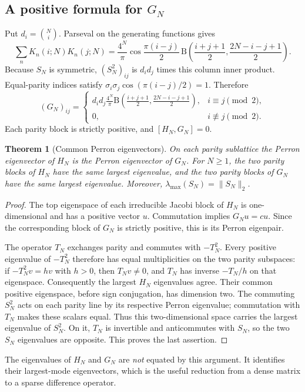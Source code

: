 \documentclass[11pt,reqno]{amsart}
\newtheorem{theorem}{Theorem}[section]
\theoremstyle{definition}\newtheorem{definition}[theorem]{Definition}
\theoremstyle{remark}\newtheorem{remark}[theorem]{Remark}
\newcommand{\norm}[1]{\lVert #1\rVert}
\begin{document}
\subsection{A positive formula for $G_N$}
Put $d_i=\binom Ni$. Parseval on the generating functions gives
\begin{equation}\label{eq:bilinear}
\sum_nK_n(i;N)K_n(j;N)
=\frac{4^N}{\pi}\cos\frac{\pi(i-j)}2\,
\mathrm B\left(\frac{i+j+1}{2},\frac{2N-i-j+1}{2}\right).
\end{equation}
Because $S_N$ is symmetric, $(S_N^2)_{ij}$ is $d_id_j$ times this
column inner product. Equal-parity indices satisfy
$\sigma_i\sigma_j\cos(\pi(i-j)/2)=1$. Therefore
\begin{equation}\label{eq:G-entries}
(G_N)_{ij}=\begin{cases}
\displaystyle d_id_j\frac{4^N}{\pi}
\mathrm B\left(\frac{i+j+1}{2},\frac{2N-i-j+1}{2}\right),
&i\equiv j\pmod2,\\[4pt]
0,&i\not\equiv j\pmod2.
\end{cases}
\end{equation}
Each parity block is strictly positive, and $[H_N,G_N]=0$.

\begin{theorem}[Common Perron eigenvectors]\label{thm:common-PF}
On each parity sublattice the Perron eigenvector of $H_N$ is the
Perron eigenvector of $G_N$. For $N\ge1$, the two parity blocks of
$H_N$ have the same largest eigenvalue, and the two parity blocks of
$G_N$ have the same largest eigenvalue. Moreover,
$\lambda_{\max}(S_N)=\norm{S_N}_2$.
\end{theorem}
\begin{proof}
The top eigenspace of each irreducible Jacobi block of $H_N$ is
one-dimensional and has a positive vector $u$. Commutation implies
$G_Nu=cu$. Since the corresponding block of $G_N$ is strictly positive,
this is its Perron eigenpair.

The operator $T_N$ exchanges parity and commutes with $-T_N^2$.
Every positive eigenvalue of $-T_N^2$ therefore has equal multiplicities
on the two parity subspaces: if $-T_N^2v=hv$ with $h>0$, then
$T_Nv\ne0$, and $T_N$ has inverse $-T_N/h$ on that eigenspace.
Consequently the largest $H_N$ eigenvalues agree. Their common
positive eigenspace, before sign conjugation, has dimension two.
The commuting $S_N^2$ acts on each parity line by its respective
Perron eigenvalue; commutation with $T_N$ makes these scalars equal.
Thus this two-dimensional space carries the largest eigenvalue of
$S_N^2$. On it, $T_N$ is invertible and anticommutes with $S_N$,
so the two $S_N$ eigenvalues are opposite. This proves the last assertion.
\end{proof}
The eigenvalues of $H_N$ and $G_N$ are \emph{not} equated by this
argument. It identifies their largest-mode eigenvectors, which is the
useful reduction from a dense matrix to a sparse difference operator.
\end{document}
